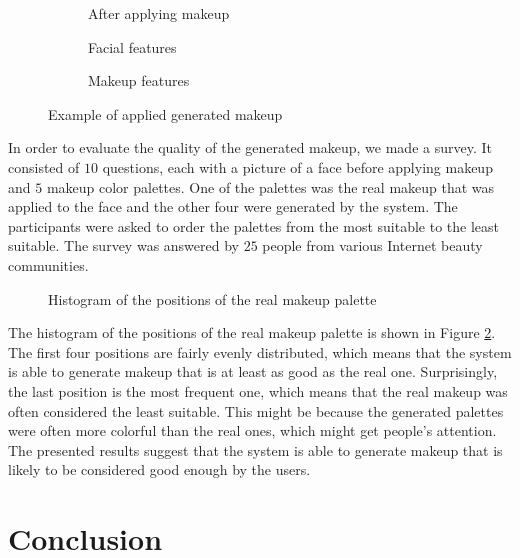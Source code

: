 \documentclass[conference]{IEEEtran}
\begin{document}
\begin{figure}
\begin{subfigure}{0.49\linewidth}
        \caption{After applying makeup}
    \end{subfigure}
    \par\vspace{0.5\baselineskip}
    \begin{subfigure}{0.49\linewidth}
        \centering 
        \caption{Facial features}
    \end{subfigure}
    \hfill
    \begin{subfigure}{0.49\linewidth}
        \centering 
        \caption{Makeup features}
    \end{subfigure}
    \caption{Example of applied generated makeup}
    \label{fig:example}
\end{figure}

In order to evaluate the quality of the generated makeup, we made a survey.
It consisted of $10$ questions, each with a picture of a face before applying makeup and $5$ makeup color palettes.
One of the palettes was the real makeup that was applied to the face and the other four were generated by the system.
The participants were asked to order the palettes from the most suitable to the least suitable.
The survey was answered by $25$ people from various Internet beauty communities.

\begin{figure}
    \vspace{0.1\baselineskip}
    \centering 
    \vspace{0.1\baselineskip}
    \caption{Histogram of the positions of the real makeup palette}
    \label{fig:survey}
\end{figure}

The histogram of the positions of the real makeup palette is shown in Figure \ref{fig:survey}.
The first four positions are fairly evenly distributed, which means that the system is able to generate makeup that is at least as good as the real one.
Surprisingly, the last position is the most frequent one, which means that the real makeup was often considered the least suitable.
This might be because the generated palettes were often more colorful than the real ones, which might get people's attention.
The presented results suggest that the system is able to generate makeup that is likely to be considered good enough by the users.

\section{Conclusion} \label{sec:conclusion}
\end{document}
